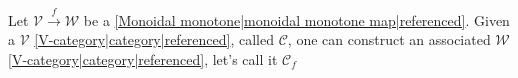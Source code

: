 
Let $\mathcal{V}\xrightarrow{f}\mathcal{W}$ be a \ref{Monoidal monotone|monoidal monotone map|referenced}. Given a $\mathcal{V}$ \ref{V-category|category|referenced}, called $\mathcal{C}$, one can construct an associated $\mathcal{W}$ \ref{V-category|category|referenced}, let's call it $\mathcal{C}_f$